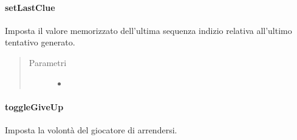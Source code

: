 \documentclass[letterpaper,10pt,italian,openany,oneside]{sphinxmanual}
\begin{document}
\paragraph{setLastClue}
\label{\detokenize{source/it/unicam/cs/pa/mastermind/players/CodeBreaker:setlastclue}}

\begin{fulllineitems}
\label{\detokenize{source/it/unicam/cs/pa/mastermind/players/CodeBreaker:it.unicam.cs.pa.mastermind.players.CodeBreaker.setLastClue(List)}}
Imposta il valore memorizzato dell’ultima sequenza indizio relativa all’ultimo tentativo generato.
\begin{quote}\begin{description}
\item[{Parametri}] \leavevmode\begin{itemize}
\item {} 
 \textendash{} 

\end{itemize}

\end{description}\end{quote}

\end{fulllineitems}



\paragraph{toggleGiveUp}
\label{\detokenize{source/it/unicam/cs/pa/mastermind/players/CodeBreaker:togglegiveup}}

\begin{fulllineitems}
\label{\detokenize{source/it/unicam/cs/pa/mastermind/players/CodeBreaker:it.unicam.cs.pa.mastermind.players.CodeBreaker.toggleGiveUp()}}
Imposta la volontà del giocatore  di arrendersi.

\end{fulllineitems}
\end{document}
